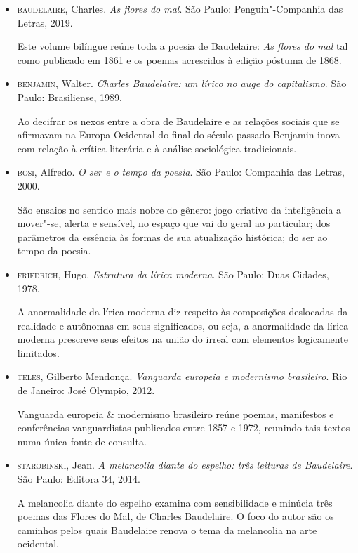 \documentclass[12pt]{extarticle}
\begin{document}
\begin{itemize}
\item\textsc{baudelaire}, Charles. \textit{As flores do mal}. São Paulo:
Penguin"-Companhia das Letras, 2019.

Este volume bilíngue reúne toda a poesia de Baudelaire: \textit{As flores do mal}
tal como publicado em 1861 e os poemas acrescidos à edição póstuma de
1868.

\item\textsc{benjamin}, Walter. \textit{Charles Baudelaire: um lírico no auge do
capitalismo}. São Paulo: Brasiliense, 1989.

Ao decifrar os nexos entre a obra de Baudelaire e as relações sociais
que se afirmavam na Europa Ocidental do final do século passado Benjamin
inova com relação à crítica literária e à análise sociológica
tradicionais.

\item\textsc{bosi}, Alfredo. \textit{O ser e o tempo da poesia}. São Paulo: Companhia
das Letras, 2000.

São ensaios no sentido mais nobre do gênero: jogo criativo da
inteligência a mover"-se, alerta e sensível, no espaço que vai do geral
ao particular; dos parâmetros da essência às formas de sua atualização
histórica; do ser ao tempo da poesia.

\item\textsc{friedrich}, Hugo. \textit{Estrutura da lírica moderna}. São Paulo: Duas
Cidades, 1978.

A anormalidade da lírica moderna diz respeito às composições deslocadas
da realidade e autônomas em seus significados, ou seja, a anormalidade
da lírica moderna prescreve seus efeitos na união do irreal com
elementos logicamente limitados.

\item\textsc{teles}, Gilberto Mendonça. \textit{Vanguarda europeia e modernismo
brasileiro}. Rio de Janeiro: José Olympio, 2012.

Vanguarda europeia \& modernismo brasileiro reúne poemas, manifestos e
conferências vanguardistas publicados entre 1857 e 1972, reunindo tais
textos numa única fonte de consulta.

\item\textsc{starobinski}, Jean. \textit{A melancolia diante do espelho: três leituras de Baudelaire}. São Paulo: Editora 34, 2014.

A melancolia diante do espelho examina com sensibilidade e minúcia três
poemas das Flores do Mal, de Charles Baudelaire. O foco do autor são os
caminhos pelos quais Baudelaire renova o tema da melancolia na arte
ocidental.
\end{itemize}
\end{document}
